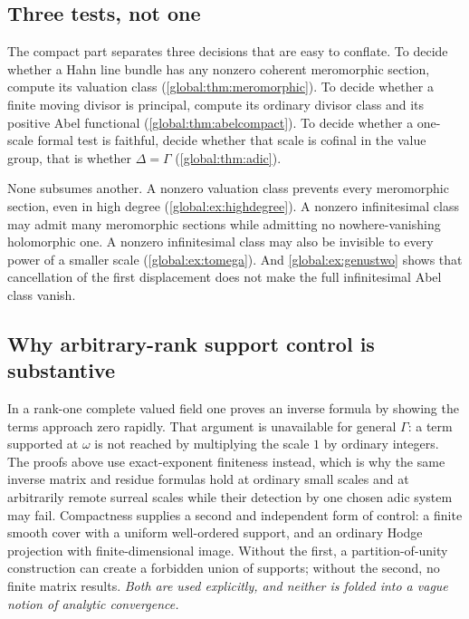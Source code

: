 \documentclass[11pt,letterpaper]{article}
\theoremstyle{definition}
\theoremstyle{remark}
\numberwithin{equation}{section}
\begin{document}
\subsection{Three tests, not one}\label{global:sub:threetests}

The compact part separates three decisions that are easy to conflate. To decide whether a Hahn line bundle has any nonzero coherent meromorphic section, compute its valuation class (\cref{global:thm:meromorphic}). To decide whether a finite moving divisor is principal, compute its ordinary divisor class and its positive Abel functional (\cref{global:thm:abelcompact}). To decide whether a one-scale formal test is faithful, decide whether that scale is cofinal in the value group, that is whether $\Delta=\Gamma$ (\cref{global:thm:adic}).

None subsumes another. A nonzero valuation class prevents every meromorphic section, even in high degree (\cref{global:ex:highdegree}). A nonzero infinitesimal class may admit many meromorphic sections while admitting no nowhere-vanishing holomorphic one. A nonzero infinitesimal class may also be invisible to every power of a smaller scale (\cref{global:ex:tomega}). And \cref{global:ex:genustwo} shows that cancellation of the first displacement does not make the full infinitesimal Abel class vanish.

\subsection{Why arbitrary-rank support control is substantive}\label{global:sub:whyrank}

In a rank-one complete valued field one proves an inverse formula by showing the terms approach zero rapidly. That argument is unavailable for general $\Gamma$: a term supported at $\omega$ is not reached by multiplying the scale $1$ by ordinary integers. The proofs above use exact-exponent finiteness instead, which is why the same inverse matrix and residue formulas hold at ordinary small scales and at arbitrarily remote surreal scales while their detection by one chosen adic system may fail. Compactness supplies a second and independent form of control: a finite smooth cover with a uniform well-ordered support, and an ordinary Hodge projection with finite-dimensional image. Without the first, a partition-of-unity construction can create a forbidden union of supports; without the second, no finite matrix results. \emph{Both are used explicitly, and neither is folded into a vague notion of analytic convergence.}
\end{document}
